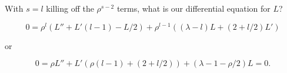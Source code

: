 With $s=l$ killing off the $\rho^{s-2}$ terms, what is our differential equation for $L$?

\begin{equation}\label{eqn:hyrdogenLaguerre:100}
0 = 
\rho^l \left( L'' + L' (l - 1 ) - L/2 \right)
+
\rho^{l-1} \left( (\lambda - l) L + (2 + l/2)L' \right)
\end{equation}

or

\begin{equation}\label{eqn:hyrdogenLaguerre:101}
0 = 
\rho L'' + L' (\rho(l-1) + (2 + l/2) ) + (\lambda -1 -\rho/2) L = 0.
\end{equation}

\EndArticle
